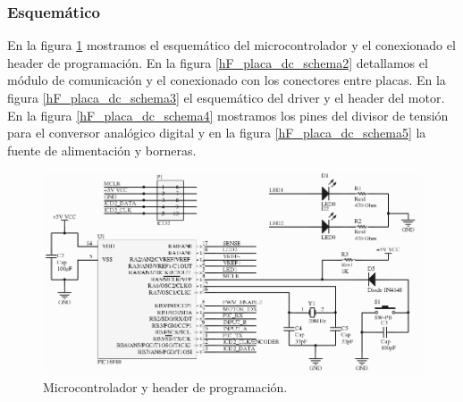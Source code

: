 \subsubsection{Esquem\'atico}
\label{h_placas_motorDC_esquematico}

En la figura \ref{hF_placa_dc_schema} mostramos el esquem\'atico del microcontrolador y el conexionado el header
de programaci\'on.
En la figura \ref{hF_placa_dc_schema2} detallamos el m\'odulo de comunicaci\'on y el conexionado con los conectores
entre placas.
En la figura \ref{hF_placa_dc_schema3} el esquem\'atico del driver y el header del motor.
En la figura \ref{hF_placa_dc_schema4} mostramos los pines del divisor de tensi\'on para el conversor anal\'ogico
digital y en la figura \ref{hF_placa_dc_schema5} la fuente de alimentaci\'on y borneras.

\begin{figure}
	\centering
	\includegraphics[scale=.3]{figuras/dc_schemaMicro.png}
	\caption{Microcontrolador y header de programaci\'on.}
	\label{hF_placa_dc_schema}
\end{figure}

